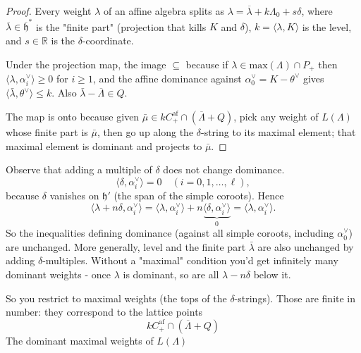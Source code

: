 \documentclass[12pt]{article}
\begin{document}
\begin{proof}
    Every weight $\lambda$ of an affine algebra splits as $\lambda=\overline{\lambda} + k\Lambda_0 + s\delta$, where $\overline{\lambda}\in\overline{\mathfrak h}^*$ is the "finite part" (projection that kills $K$ and $\delta$), $k=\langle\lambda,K\rangle$ is the level, and $s\in\mathbb{R}$ is the $\delta$-coordinate.

    Under the projection map, the image $\subseteq$ because if $\lambda \in \mathrm{max}(\Lambda) \cap P_+$ then $\langle\lambda,\alpha_i^\vee\rangle \geq 0$ for $i \geq 1$, and the affine dominance against $\alpha_0^\vee = K-\theta^\vee$ gives $\langle\bar\lambda,\theta^\vee\rangle \leq k$. Also $\bar\lambda-\overline{\Lambda} \in Q$.

    The map is onto because given $\bar\mu \in kC^{\text{af}}_+ \cap (\overline{\Lambda}+Q)$, pick any weight of $L(\Lambda)$ whose finite part is $\bar\mu$, then go up along the $\delta$-string to its maximal element; that maximal element is dominant and projects to $\bar\mu$.
\end{proof}

\begin{remark}
    Observe that adding a multiple of $\delta$ does not change dominance.
    \[
        \langle \delta,\alpha_i^\vee\rangle=0 \quad (i=0,1,\ldots,\ell),
    \]
    because $\delta$ vanishes on $\mathfrak h'$ (the span of the simple coroots). Hence
    \[
        \langle \lambda+n\delta,\alpha_i^\vee\rangle = \langle \lambda,\alpha_i^\vee\rangle+n\underbrace{\langle \delta,\alpha_i^\vee\rangle}_{0} = \langle \lambda,\alpha_i^\vee\rangle.
    \]
    So the inequalities defining dominance (against all simple coroots, including $\alpha_0^\vee$) are unchanged. More generally, level and the finite part $\bar\lambda$ are also unchanged by adding $\delta$-multiples.
    Without a "maximal" condition you'd get infinitely many dominant weights - once $\lambda$ is dominant, so are all $\lambda-n\delta$ below it.

    So you restrict to maximal weights (the tops of the $\delta$-strings). Those are finite in number: they correspond to the lattice points
    \[
        kC^{\mathrm{af}}_+ \cap (\overline{\Lambda}+Q)
    \]
    The dominant maximal weights of $L(\Lambda)$
\end{remark}
\end{document}
